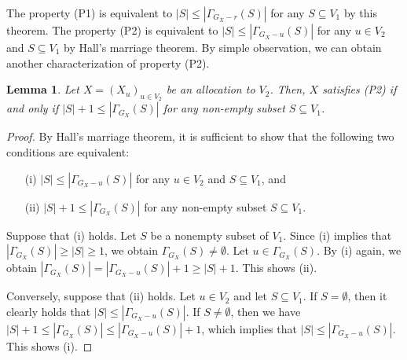 \documentclass[11pt]{article}
\newtheorem{lemma}[theorem]{Lemma}
\newcommand{\PROPavg}{\textsf{PROPavg}\xspace}
\begin{document}
The property (P1) is equivalent to $|S| \le |\Gamma_{G_{X}- r}(S)|$ for any $S\subseteq V_1$ by this theorem.
The property (P2) is equivalent to $|S| \le |\Gamma_{G_{X}- u}(S)|$ for any $u\in V_2$ and $S\subseteq V_1$ by Hall's marriage theorem.
By simple observation, we can obtain another characterization of property (P2).
\begin{lemma}\label{ob: p2}
Let $X=(X_u)_{u\in V_2}$ be an allocation to $V_2$.
Then, 
$X$ satisfies (P2) if and only if $|S|+1 \le |\Gamma_{G_{X}}(S)|$ for any non-empty subset $S\subseteq V_1$.
\end{lemma}
\begin{proof}
By Hall's marriage theorem, it is sufficient to show that the following two conditions are  equivalent: 
\begin{enumerate}
\item[(i)] $|S| \le |\Gamma_{G_{X}- u}(S)|$ for any $u\in V_2$ and $S\subseteq V_1$, and
\item[(ii)] $|S|+1 \le |\Gamma_{G_{X}}(S)|$ for any non-empty subset $S\subseteq V_1$.
\end{enumerate}

Suppose that (i) holds. Let $S$ be a nonempty subset of $V_1$. 
Since (i) implies that $|\Gamma_{G_{X}}(S)| \ge |S| \ge 1$, we obtain $\Gamma_{G_{X}}(S) \not= \emptyset$. 
Let $u \in \Gamma_{G_{X}}(S)$. 
By (i) again, we obtain $|\Gamma_{G_{X}}(S)| = |\Gamma_{G_{X} -u}(S)| + 1 \ge |S| + 1$. 
This shows (ii). 

Conversely, suppose that (ii) holds. Let $u \in V_2$ and let $S \subseteq V_1$. 
If $S=\emptyset$, then it clearly holds that $|S| \le |\Gamma_{G_{X}- u}(S)|$.
If $S \neq \emptyset$, then 
we have $|S|+1 \le |\Gamma_{G_{X}}(S)|\le|\Gamma_{G_X-u}(S)|+1$, which implies that $|S| \le |\Gamma_{G_X-u}(S)|$.
This shows (i). 
\end{proof}

\end{document}
